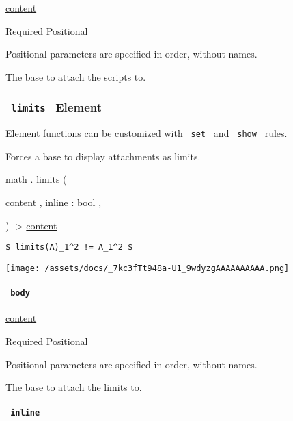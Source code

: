\href{/docs/reference/foundations/content/}{content}

{Required} {{ Positional }}

\label{functions-scripts-body-positional-tooltip}
Positional parameters are specified in order, without names.

The base to attach the scripts to.

\subsubsection{\texorpdfstring{\texttt{\ limits\ } {{ Element
}}}{ limits   Element }}\label{functions-limits}

\label{functions-limits-element-tooltip}
Element functions can be customized with \texttt{\ set\ } and
\texttt{\ show\ } rules.

Forces a base to display attachments as limits.

math { . } { limits } (

{ \href{/docs/reference/foundations/content/}{content} , } {
\hyperref[functions-limits-parameters-inline]{inline :}
\href{/docs/reference/foundations/bool/}{bool} , }

) -\textgreater{} \href{/docs/reference/foundations/content/}{content}

\begin{verbatim}
$ limits(A)_1^2 != A_1^2 $
\end{verbatim}

\texttt{[image: /assets/docs/\_7kc3fTt948a-U1\_9wdyzgAAAAAAAAAA.png]}

\paragraph{\texorpdfstring{\texttt{\ body\ }}{ body }}\label{functions-limits-body}

\href{/docs/reference/foundations/content/}{content}

{Required} {{ Positional }}

\label{functions-limits-body-positional-tooltip}
Positional parameters are specified in order, without names.

The base to attach the limits to.

\paragraph{\texorpdfstring{\texttt{\ inline\ }}{ inline }}\label{functions-limits-inline}

